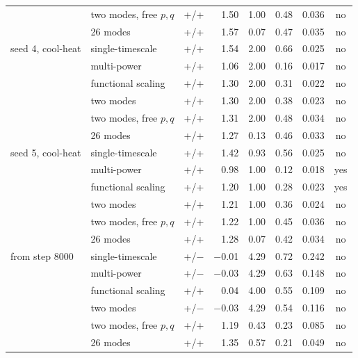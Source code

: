 \begin{longtable}{llcrrrrc}
 & two modes, free $p,q$ & +/+ & 1.50 & 1.00 & 0.48 & 0.036 & no\\
 & 26 modes & +/+ & 1.57 & 0.07 & 0.47 & 0.035 & no\\
\addlinespace
seed 4, cool-heat & single-timescale & +/+ & 1.54 & 2.00 & 0.66 & 0.025 & no\\
 & multi-power & +/+ & 1.06 & 2.00 & 0.16 & 0.017 & no\\
 & functional scaling & +/+ & 1.30 & 2.00 & 0.31 & 0.022 & no\\
 & two modes & +/+ & 1.30 & 2.00 & 0.38 & 0.023 & no\\
 & two modes, free $p,q$ & +/+ & 1.31 & 2.00 & 0.48 & 0.034 & no\\
 & 26 modes & +/+ & 1.27 & 0.13 & 0.46 & 0.033 & no\\
\addlinespace
seed 5, cool-heat & single-timescale & +/+ & 1.42 & 0.93 & 0.56 & 0.025 & no\\
 & multi-power & +/+ & 0.98 & 1.00 & 0.12 & 0.018 & yes\\
 & functional scaling & +/+ & 1.20 & 1.00 & 0.28 & 0.023 & yes\\
 & two modes & +/+ & 1.21 & 1.00 & 0.36 & 0.024 & no\\
 & two modes, free $p,q$ & +/+ & 1.22 & 1.00 & 0.45 & 0.036 & no\\
 & 26 modes & +/+ & 1.28 & 0.07 & 0.42 & 0.034 & no\\
\addlinespace
from step 8000 & single-timescale & +/$-$ & $-$0.01 & 4.29 & 0.72 & 0.242 & no\\
 & multi-power & +/$-$ & $-$0.03 & 4.29 & 0.63 & 0.148 & no\\
 & functional scaling & +/+ & 0.04 & 4.00 & 0.55 & 0.109 & no\\
 & two modes & +/$-$ & $-$0.03 & 4.29 & 0.54 & 0.116 & no\\
 & two modes, free $p,q$ & +/+ & 1.19 & 0.43 & 0.23 & 0.085 & no\\
 & 26 modes & +/+ & 1.35 & 0.57 & 0.21 & 0.049 & no\\
\end{longtable}
